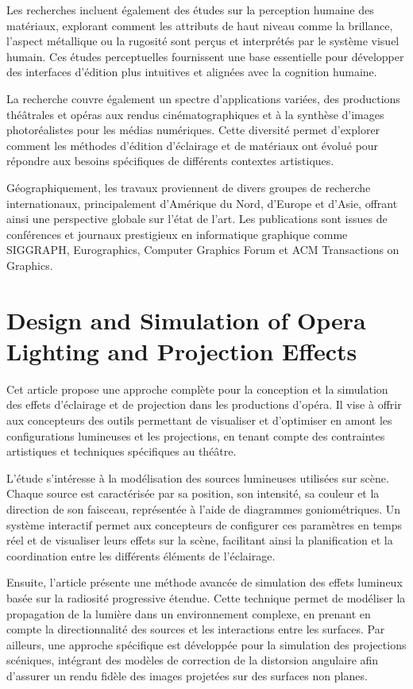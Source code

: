 \documentclass[runningheads]{llncs}
\begin{document}
Les recherches incluent également des études sur la perception humaine des matériaux, explorant comment les attributs de haut niveau comme la brillance, l'aspect métallique ou la rugosité sont perçus et interprétés par le système visuel humain. Ces études perceptuelles fournissent une base essentielle pour développer des interfaces d'édition plus intuitives et alignées avec la cognition humaine.

La recherche couvre également un spectre d'applications variées, des productions théâtrales et opéras aux rendus cinématographiques et à la synthèse d'images photoréalistes pour les médias numériques. Cette diversité permet d'explorer comment les méthodes d'édition d'éclairage et de matériaux ont évolué pour répondre aux besoins spécifiques de différents contextes artistiques.

Géographiquement, les travaux proviennent de divers groupes de recherche internationaux, principalement d'Amérique du Nord, d'Europe et d'Asie, offrant ainsi une perspective globale sur l'état de l'art. Les publications sont issues de conférences et journaux prestigieux en informatique graphique comme SIGGRAPH, Eurographics, Computer Graphics Forum et ACM Transactions on Graphics.

\section{Design and Simulation of  Opera Lighting and Projection Effects}
Cet article propose une approche complète pour la conception et la simulation des effets d’éclairage et de projection dans les productions d’opéra. 
Il vise à offrir aux concepteurs des outils permettant de visualiser et d’optimiser en amont les configurations lumineuses et les projections, en 
tenant compte des contraintes artistiques et techniques spécifiques au théâtre.

L’étude s’intéresse à la modélisation des sources lumineuses utilisées sur scène. Chaque source est caractérisée par sa position, 
son intensité, sa couleur et la direction de son faisceau, représentée à l’aide de diagrammes goniométriques. Un système interactif permet aux 
concepteurs de configurer ces paramètres en temps réel et de visualiser leurs effets sur la scène, facilitant ainsi la planification et 
la coordination entre les différents éléments de l’éclairage.

Ensuite, l’article présente une méthode avancée de simulation des effets lumineux basée sur la radiosité progressive étendue.
Cette technique permet de modéliser la propagation de la lumière dans un environnement complexe, en prenant en compte la directionnalité 
des sources et les interactions entre les surfaces. Par ailleurs, une approche spécifique est développée pour la simulation des projections 
scéniques, intégrant des modèles de correction de la distorsion angulaire afin d’assurer un rendu fidèle des images projetées sur des surfaces 
non planes.
\end{document}
